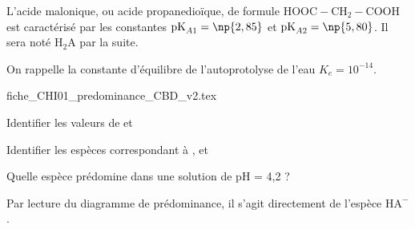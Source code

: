 \debutEntrainement

L’acide malonique, ou acide propanedioïque, de formule $\textrm{HOOC}-\textrm{CH}_2-\textrm{COOH}$ est caractérisé par les constantes $\textrm{pK}_{A1}=\np{2,85}$ et $\textrm{pK}_{A2}=\np{5,80}$. Il sera noté $\textrm{H}_2\textrm{A}$ par la suite. 

On rappelle la constante d'équilibre de l'autoprotolyse de l'eau $K_e=10^{-14}$.

\begin{center}
{fiche_CHI01_predominance_CBD_v2.tex}
\end{center}


\begin{enonce}
Identifier les valeurs de \reponseX{} et \reponseY{}
\end{enonce}




\begin{enonce}
Identifier les espèces correspondant à \reponseA{}, \reponseB{} et \reponseC{}
\end{enonce}






\begin{enonce}
Quelle espèce prédomine dans une solution de \textrm{pH} = 4,2 ?
\end{enonce}


\begin{corrige}
Par lecture du diagramme de prédominance, il s'agit directement de l'espèce $\textrm{H}\textrm{A}^-$.
\end{corrige}

